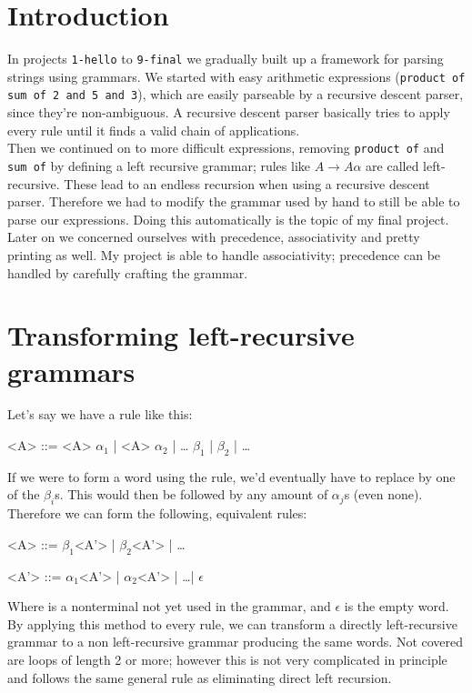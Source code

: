 \documentclass{article}
\title{}
\author{Simon Wegendt}
\begin{document}
 
\section{Introduction}
In projects \verb|1-hello| to \verb|9-final| we gradually built up a framework for parsing strings using grammars.  We started with easy arithmetic expressions (\verb|product of sum of 2 and 5 and 3|), which are easily parseable by a recursive descent parser, since they're non-ambiguous. A recursive descent parser basically tries to apply every rule until it finds a valid chain of applications.\\
Then we continued on to more difficult expressions, removing \verb|product of| and \verb|sum of| by defining a left recursive grammar; rules like $A\to A\alpha$ are called left-recursive. These lead to an endless recursion when using a recursive descent parser. Therefore we had to modify the grammar used by hand to still be able to parse our expressions. Doing this automatically is the topic of my final project.\\
Later on we concerned ourselves with precedence, associativity and pretty printing as well. My project is able to handle associativity; precedence can be handled by carefully crafting the grammar. 

\section{Transforming left-recursive grammars}\label{sec:transforming}
Let's say we have a rule like this: 
\begin{grammar}
<A> ::= <A> $\alpha_1$ | <A> $\alpha_2$ | \ldots
 \alt $\beta_1$ | $\beta_2$ | \ldots
\end{grammar}
If we were to form a word using the rule, we'd eventually have to replace  by one of the $\beta_i$s. This would then be followed by any amount of $\alpha_j$s (even none). Therefore we can form the following, equivalent rules:
\begin{grammar}
<A>  ::= $\beta_1$<A'>  | $\beta_2$<A'>  | \ldots

<A'> ::= $\alpha_1$<A'> | $\alpha_2$<A'> | \ldots | $\epsilon$
\end{grammar}
Where  is a nonterminal not yet used in the grammar, and $\epsilon$ is the empty word.\\
By applying this method to every rule, we can transform a directly left-recursive grammar to a non left-recursive grammar producing the same words. Not covered are loops of length 2 or more; however this is not very complicated in principle and follows the same general rule as eliminating direct left recursion.
\end{document}
